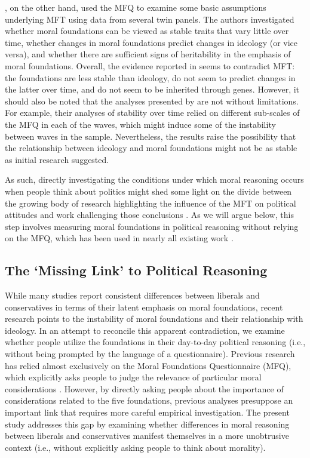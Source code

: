 \documentclass[12pt]{article}
\begin{document}
\citet{smith2016intuitive}, on the other hand, used the MFQ to examine some basic assumptions underlying MFT using data from several twin panels. The authors investigated whether moral foundations can be viewed as stable traits that vary little over time, whether changes in moral foundations predict changes in ideology (or vice versa), and whether there are sufficient signs of heritability in the emphasis of moral foundations. Overall, the evidence reported in \citet{smith2016intuitive} seems to contradict MFT: the foundations are less stable than ideology, do not seem to predict changes in the latter over time, and do not seem to be inherited through genes. However, it should also be noted that the analyses presented by \citet{smith2016intuitive} are not without limitations. For example, their analyses of stability over time relied on different sub-scales of the MFQ in each of the waves, which might induce some of the instability between waves in the sample. Nevertheless, the results raise the possibility that the relationship between ideology and moral foundations might not be as stable as initial research suggested.

As such, directly investigating the conditions under which moral reasoning occurs when people think about politics might shed some light on the divide between the growing body of research highlighting the influence of the MFT on political attitudes and work challenging those conclusions \citep[e.g.][]{smith2016intuitive}. As we will argue below, this step involves measuring moral foundations in political reasoning without relying on the MFQ, which has been used in nearly all existing work \citep[but see][]{clifford2014linking}.


\subsection{The `Missing Link' to Political Reasoning}

While many studies report consistent differences between liberals and conservatives in terms of their latent emphasis on moral foundations, recent research points to the instability of moral foundations and their relationship with ideology. In an attempt to reconcile this apparent contradiction, we examine whether people utilize the foundations in their day-to-day political reasoning (i.e., without being prompted by the language of a questionnaire). Previous research has relied almost exclusively on the Moral Foundations Questionnaire (MFQ), which explicitly asks people to judge the relevance of particular moral considerations \citep[e.g.][]{graham2011mapping}. However, by directly asking people about the importance of considerations related to the five foundations, previous analyses presuppose an important link that requires more careful empirical investigation. The present study addresses this gap by examining whether differences in moral reasoning between liberals and conservatives manifest themselves in a more unobtrusive context (i.e., without explicitly asking people to think about morality).
\end{document}
